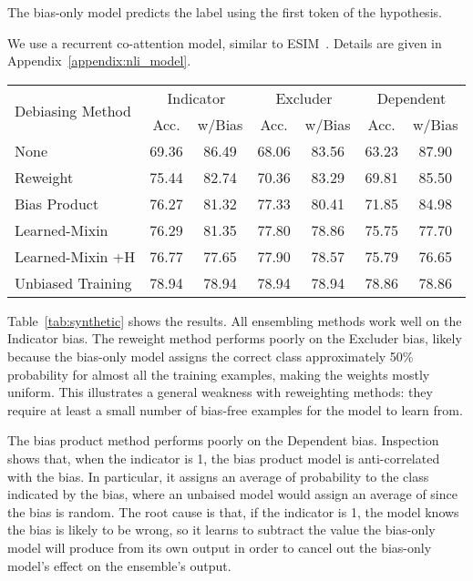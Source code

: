\documentclass[11pt,a4paper]{article}
\begin{document}
 The bias-only model predicts the label using the first token of the hypothesis. 

 We use a recurrent co-attention model, similar to ESIM~\cite{chen2016enhanced}. Details are given in Appendix~\ref{appendix:nli_model}.

\begin{table*}
\centering
\tablefont
\begin{tabular}{lcccccc} \toprule
\multirow{2}{*}{Debiasing Method} & \multicolumn{2}{c}{Indicator} & \multicolumn{2}{c}{Excluder} & \multicolumn{2}{c}{Dependent}\\ 
 & Acc. & w/Bias & Acc. & w/Bias & Acc. & w/Bias\\ \midrule
None & 69.36 & 86.49 & 68.06 & 83.56 & 63.23 & 87.90 \\
Reweight & 75.44 & 82.74 & 70.36 & 83.29 & 69.81 & 85.50 \\
Bias Product & 76.27 & 81.32 & 77.33 & 80.41 & 71.85 & 84.98 \\
Learned-Mixin & 76.29 & 81.35 & 77.80 & 78.86 & 75.75 & 77.70 \\
Learned-Mixin +H & 76.77 & 77.65 & 77.90 & 78.57 & 75.79 & 76.65 \\ \hdashline
Unbiased Training & 78.94 & 78.94 & 78.94 & 78.94 & 78.86 & 78.86 \\
\bottomrule
\end{tabular}

\caption{Results on MNLI with different kinds of synthetic bias. The Acc columns show the accuracy on the out-of-domain test set, and the w/Bias columns show accuracy on the in-domain test. Unbiased Training is an upper bound constructed by training a model with the same randomized features that are used at test time.}
\label{tab:synthetic}
\end{table*}
 
 Table~\ref{tab:synthetic} shows the results.
All ensembling methods work well on the Indicator bias. The reweight method performs poorly on the Excluder bias, likely because the bias-only model assigns the correct class approximately 50\% probability for almost all the training examples, making the weights mostly uniform. 
This illustrates a general weakness with reweighting methods: they require at least a small number of bias-free examples for the model to learn from.


The bias product method performs poorly on the Dependent bias.
Inspection shows that, when the indicator is 1, the bias product model is anti-correlated with the bias. In particular, it assigns an average of  probability to the class indicated by the bias, where an unbaised model would assign an average of  since the bias is random.
The root cause is that, if the indicator is 1, the model knows the bias is likely to be wrong, so it learns to subtract the value the bias-only model will produce from its own output in order to cancel out the bias-only model's effect on the ensemble's output. 
\end{document}
